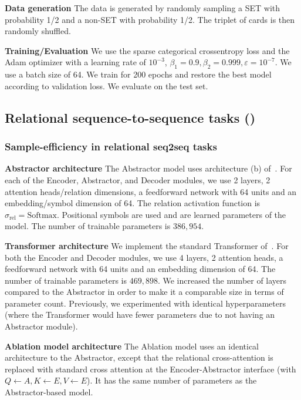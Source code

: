 \textbf{Data generation} The data is generated by randomly sampling a SET with probability 1/2 and a non-SET with probability 1/2. The triplet of cards is then randomly shuffled.

\textbf{Training/Evaluation} We use the sparse categorical crossentropy loss and the Adam optimizer with a learning rate of $10^{-3}$, $\beta_1 = 0.9, \beta_2 = 0.999, \varepsilon = 10^{-7}$. We use a batch size of 64. We train for 200 epochs and restore the best model according to validation loss. We evaluate on the test set.


\subsection{Relational sequence-to-sequence tasks ()}

\subsubsection{Sample-efficiency in relational seq2seq tasks}

\textbf{Abstractor architecture} The Abstractor model uses architecture (b) of~. For each of the Encoder, Abstractor, and Decoder modules, we use 2 layers, 2 attention heads/relation dimensions, a feedforward network with 64 units and an embedding/symbol dimension of 64. The relation activation function is $\sigma_{\mathrm{rel}} = \mathrm{Softmax}$. Positional symbols are used  and are learned parameters of the model. The number of trainable parameters is $386,954$.

\textbf{Transformer architecture} We implement the standard Transformer of~\citep{vaswani2017attention}. For both the Encoder and Decoder modules, we use 4 layers, 2 attention heads, a feedforward network with 64 units and an embedding dimension of 64. The number of trainable parameters is $469,898$. We increased the number of layers compared to the Abstractor in order to make it a comparable size in terms of parameter count. Previously, we experimented with identical hyperparameters (where the Transformer would have fewer parameters due to not having an Abstractor module).

\textbf{Ablation model architecture} The Ablation model uses an identical architecture to the Abstractor, except that the relational cross-attention is replaced with standard cross attention at the Encoder-Abstractor interface (with $Q \gets A, K \gets E, V \gets E$). It has the same number of parameters as the Abstractor-based model.

